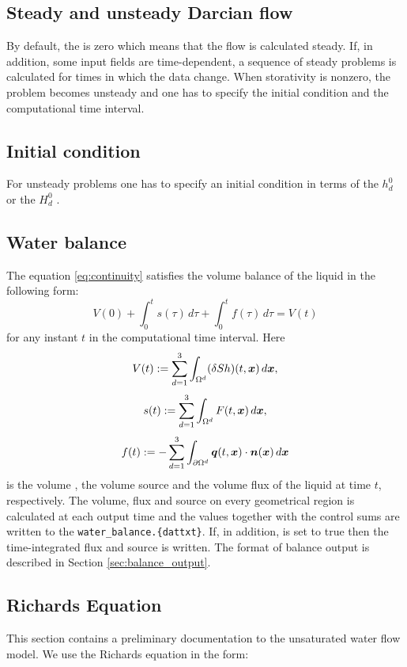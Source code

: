 \subsection{Steady and unsteady Darcian flow}

By default, the  is zero which means that the flow is calculated steady.
If, in addition, some input fields are time-dependent, a sequence of steady problems is calculated for times in which the data change.
When storativity is nonzero, the problem becomes unsteady and one has to specify the initial condition and the computational time interval.

\subsection{Initial condition}
For unsteady problems one has to specify an initial condition in terms of the 
$h_d^0$ 
or the 
$H_d^0$ .

\subsection{Water balance}
The equation \eqref{eq:continuity} satisfies the volume balance of the liquid in the following form:
\[ V(0) + \int_0^t s(\tau) \,d\tau + \int_0^t f(\tau) \,d\tau = V(t) \]
for any instant $t$ in the computational time interval.
Here
$$ V(t) := \sum_{d=1}^3\int_{\Omega^d}(\delta S h)(t,\mathbf{\boldsymbol{x}})\,d\mathbf{\boldsymbol{x}}, $$
$$ s(t) := \sum_{d=1}^3\int_{\Omega^d}F(t,\mathbf{\boldsymbol{x}})\,d\mathbf{\boldsymbol{x}}, $$
$$ f(t) := -\sum_{d=1}^3\int_{\partial\Omega^d}\mathbf{\boldsymbol{q}}(t,\mathbf{\boldsymbol{x}})\cdot\mathbf{\boldsymbol{n}}(\mathbf{\boldsymbol{x}}) \,d\mathbf{\boldsymbol{x}} $$
is the volume , the volume source  and the volume flux  of the liquid at time $t$, respectively.
The volume, flux and source on every geometrical region is calculated at each output time and the values together with the control sums are written to the  \texttt{water\_balance.\{dat\textbar txt\}}.
If, in addition,  is set to true then the time-integrated flux and source is written.
The format of balance output is described in Section \ref{sec:balance_output}.

\subsection{Richards Equation}
This section contains a preliminary documentation to the unsaturated water flow model. We use the Richards equation in the form:


